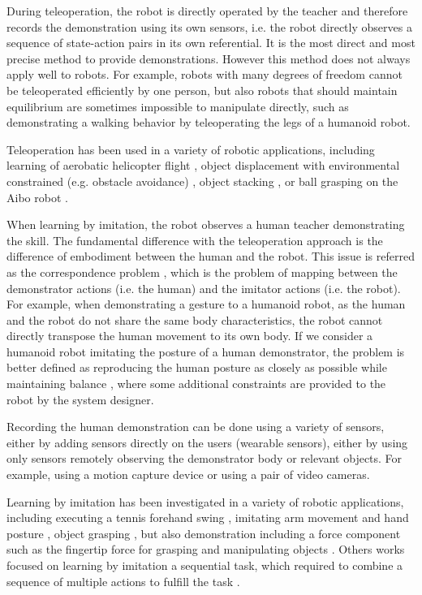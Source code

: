 During teleoperation, the robot is directly operated by the teacher and therefore records the demonstration using its own sensors, i.e. the robot directly observes a sequence of state-action pairs in its own referential. It is the most direct and most precise method to provide demonstrations. However this method does not always apply well to robots. For example, robots with many degrees of freedom cannot be teleoperated efficiently by one person, but also robots that should maintain equilibrium are sometimes impossible to manipulate directly, such as demonstrating a walking behavior by teleoperating the legs of a humanoid robot.

Teleoperation has been used in a variety of robotic applications, including learning of aerobatic helicopter flight \cite{abbeel2007application}, object displacement with environmental constrained (e.g. obstacle avoidance) \cite{guenter2007reinforcement,calinon2007teacher}, object stacking \cite{calinon2007teacher}, or ball grasping on the Aibo robot \cite{grollman2007learning}.

When learning by imitation, the robot observes a human teacher demonstrating the skill. The fundamental difference with the teleoperation approach is the difference of embodiment between the human and the robot. This issue is referred as the correspondence problem \cite{nehaniv2002correspondence}, which is the problem of mapping between the demonstrator actions (i.e. the human) and the imitator actions (i.e. the robot). For example, when demonstrating a gesture to a humanoid robot, as the human and the robot do not share the same body characteristics, the robot cannot directly transpose the human movement to its own body. If we consider a humanoid robot imitating the posture of a human demonstrator, the problem is better defined as reproducing the human posture as closely as possible while maintaining balance \cite{hyon2007full,yamane2009simultaneous}, where some additional constraints are provided to the robot by the system designer.

Recording the human demonstration can be done using a variety of sensors, either by adding sensors directly on the users (wearable sensors), either by using only sensors remotely observing the demonstrator body or relevant objects. For example, using a motion capture device or using a pair of video cameras.

Learning by imitation has been investigated in a variety of robotic applications, including executing a tennis forehand swing \cite{ijspeert2002movement}, imitating arm movement \cite{billard2001learning} and hand posture \cite{chella2004posture}, object grasping \cite{lopes2005visual,tegin2009demonstration}, but also demonstration including a force component such as the fingertip force for grasping and manipulating objects \cite{lin2012learning}. Others works focused on learning by imitation a sequential task, which required to combine a sequence of multiple actions to fulfill the task \cite{pardowitz2005learning,natarajan2011imitation}.

